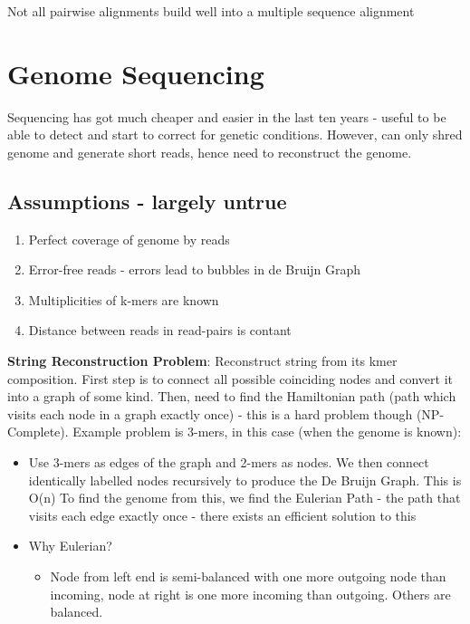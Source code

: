 \documentclass{article}
\newenvironment{cons}{\par\color{red}}{\par}
\begin{document}
\begin{cons}
Not all pairwise alignments build well into a multiple sequence alignment
\end{cons}



\section{Genome Sequencing}
Sequencing has got much cheaper and easier in the last ten years - useful to be able to detect and start to correct for genetic conditions. However, can only shred genome and generate short reads, hence need to reconstruct the genome.\\

\subsection{Assumptions - largely untrue}
\begin{enumerate}
    \item Perfect coverage of genome by reads
    \item Error-free reads - errors lead to bubbles in de Bruijn Graph
    \item Multiplicities of k-mers are known
    \item Distance between reads in read-pairs is contant
\end{enumerate}
\noindent
\textbf{String Reconstruction Problem}: Reconstruct string from its kmer composition.
First step is to connect all possible coinciding nodes and convert it into a graph of some kind. Then, need to find the Hamiltonian path (path which visits each node in a graph exactly once) - this is a hard problem though (NP-Complete). Example problem is 3-mers, in this case (when the genome is known):
\begin{itemize}
    \item Use 3-mers as edges of the graph and 2-mers as nodes. We then connect identically labelled nodes recursively to produce the De Bruijn Graph. This is O(n) To find the genome from this, we find the Eulerian Path - the path that visits each edge exactly once - there exists an efficient solution to this
    \item Why Eulerian?
    \begin{itemize}
        \item Node from left end is semi-balanced with one more outgoing node than incoming, node at right is one more incoming than outgoing. Others are balanced.
    \end{itemize}
\end{itemize}
\end{document}
